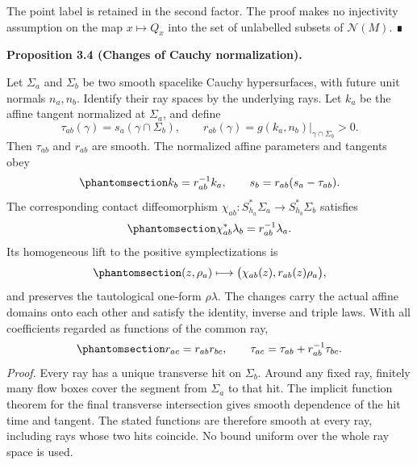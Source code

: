 \documentclass[
  english,
  11pt,
  reqno]{amsart}
\makeatletter
\newcommand{\pandocstatementheading}[1]{%
  \par\if@nobreak\else
    \addpenalty{\@beginparpenalty}%
    \addvspace{.5\baselineskip plus .2\baselineskip minus .2\baselineskip}%
  \fi
  {\normalfont\bfseries #1\par}%
  \nobreak\@afterindenttrue\@afterheading
}
\makeatother
\begin{document}
The point label is retained in the second factor. The proof makes no
injectivity assumption on the map \(x\mapsto Q_x\) into the set of
unlabelled subsets of \(\mathcal N(M)\). ∎

\pandocstatementheading{\protect{}\label{prop:global-cauchy-affine-change}Proposition 3.4 (Changes of Cauchy normalization).}

Let \(\Sigma_a\) and \(\Sigma_b\) be two smooth spacelike Cauchy
hypersurfaces, with future unit normals \(n_a,n_b\). Identify their ray
spaces by the underlying rays. Let \(k_a\) be the affine tangent
normalized at \(\Sigma_a\), and define \[
\tau_{ab}(\gamma)=s_a(\gamma\cap\Sigma_b),
\qquad
r_{ab}(\gamma)=g(k_a,n_b)|_{\gamma\cap\Sigma_b}>0.
\] Then \(\tau_{ab}\) and \(r_{ab}\) are smooth. The normalized affine
parameters and tangents obey
\begin{equation}\protect\phantomsection\label{eq:global-cauchy-affine-change}{
k_b=r_{ab}^{-1}k_a,
\qquad
s_b=r_{ab}(s_a-\tau_{ab}).
}\end{equation} The corresponding contact diffeomorphism
\(\chi_{ab}:S_{h_a}^*\Sigma_a\to S_{h_b}^*\Sigma_b\) satisfies
\begin{equation}\protect\phantomsection\label{eq:global-cauchy-contact-multiplier}{
\chi_{ab}^*\lambda_b=r_{ab}^{-1}\lambda_a.
}\end{equation} Its homogeneous lift to the positive symplectizations is
\begin{equation}\protect\phantomsection\label{eq:global-cauchy-homogeneous-lift}{
(z,\rho_a)\longmapsto
\bigl(\chi_{ab}(z),r_{ab}(z)\rho_a\bigr),
}\end{equation} and preserves the tautological one-form \(\rho\lambda\).
The changes carry the actual affine domains onto each other and satisfy
the identity, inverse and triple laws. With all coefficients regarded as
functions of the common ray,
\begin{equation}\protect\phantomsection\label{eq:global-cauchy-affine-cocycle}{
r_{ac}=r_{ab}r_{bc},
\qquad
\tau_{ac}=\tau_{ab}+r_{ab}^{-1}\tau_{bc}.
}\end{equation} \emph{Proof.} Every ray has a unique transverse hit on
\(\Sigma_b\). Around any fixed ray, finitely many flow boxes cover the
segment from \(\Sigma_a\) to that hit. The implicit function theorem for
the final transverse intersection gives smooth dependence of the hit
time and tangent. The stated functions are therefore smooth at every
ray, including rays whose two hits coincide. No bound uniform over the
whole ray space is used.
\end{document}
